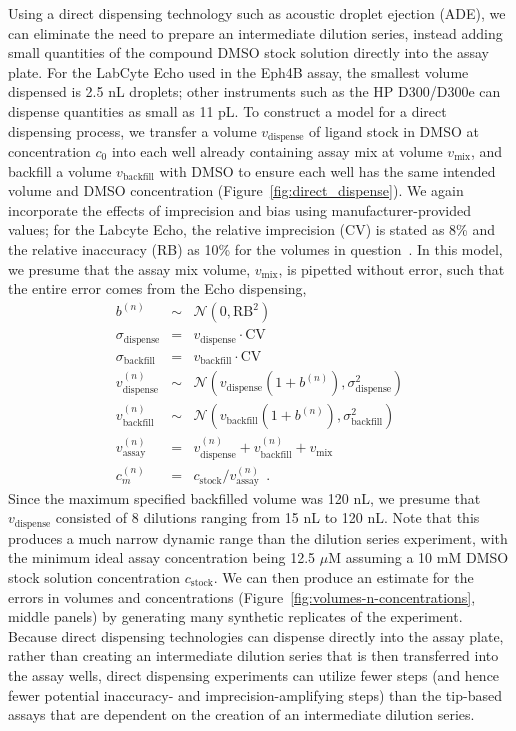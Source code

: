 \documentclass[aps,pre,twocolumn,nofootinbib,superscriptaddress,linenumbers]{revtex4-1}
\begin{document}
Using a direct dispensing technology such as acoustic droplet ejection (ADE), we can eliminate the need to prepare an intermediate dilution series, instead adding small quantities of the compound DMSO stock solution directly into the assay plate.
For the LabCyte Echo used in the Eph4B assay, the smallest volume dispensed is 2.5 nL droplets; other instruments such as the HP D300/D300e can dispense quantities as small as 11 pL.
To construct a model for a direct dispensing process, we transfer a volume $v_\mathrm{dispense}$ of ligand stock in DMSO at concentration $c_0$ into each well already containing assay mix at volume $v_\mathrm{mix}$, and backfill a volume $v_\mathrm{backfill}$ with DMSO to ensure each well has the same intended volume and DMSO concentration (Figure~\ref{fig:direct_dispense}). 
We again incorporate the effects of imprecision and bias using manufacturer-provided values;
for the Labcyte Echo, the relative imprecision (CV) is stated as 8\% and the relative inaccuracy (RB) as 10\% for the volumes in question~\cite{_echo_2011}.
In this model, we presume that the assay mix volume, $v_\mathrm{mix}$, is pipetted without error, such that the entire error comes from the Echo dispensing,
\begin{eqnarray}
b^{(n)} &\sim& \mathcal{N}(0, \mathrm{RB}^2) \nonumber \\
\sigma_\mathrm{dispense} &=& v_\mathrm{dispense} \cdot \mathrm{CV} \nonumber \\
\sigma_\mathrm{backfill} &=& v_\mathrm{backfill} \cdot \mathrm{CV} \nonumber \\
v_\mathrm{dispense}^{(n)} &\sim& \mathcal{N}(v_\mathrm{dispense} (1 + b^{(n)}) , \sigma_\mathrm{dispense}^2) \nonumber \\
v_\mathrm{backfill}^{(n)} &\sim& \mathcal{N}(v_\mathrm{backfill} (1 + b^{(n)}), \sigma_\mathrm{backfill}^2) \nonumber \\
v_\mathrm{assay}^{(n)} &=& v_\mathrm{dispense}^{(n)} + v_\mathrm{backfill}^{(n)} + v_\mathrm{mix} \nonumber \\
c_m^{(n)} &=& c_\mathrm{stock} / v_\mathrm{assay}^{(n)} \:\: . \label{equation:stock-concentration-uncertainty-simple}
\end{eqnarray}
Since the maximum specified backfilled volume was 120 nL, we presume that $v_\mathrm{dispense}$ consisted of 8 dilutions ranging from 15 nL to 120 nL. 
Note that this produces a much narrow dynamic range than the dilution series experiment, with the minimum ideal assay concentration being 12.5 $\mu$M assuming a 10 mM DMSO stock solution concentration $c_\mathrm{stock}$.
We can then produce an estimate for the errors in volumes and concentrations (Figure~\ref{fig:volumes-n-concentrations}, middle panels) by generating many synthetic replicates of the experiment.
Because direct dispensing technologies can dispense directly into the assay plate, rather than creating an intermediate dilution series that is then transferred into the assay wells, direct dispensing experiments can utilize fewer steps (and hence fewer potential inaccuracy- and imprecision-amplifying steps) than the tip-based assays that are dependent on the creation of an intermediate dilution series.
\end{document}
